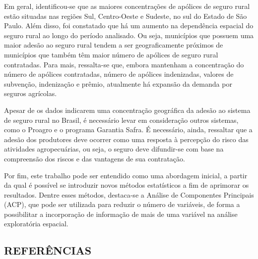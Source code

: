 Em geral, identificou-se que as maiores concentrações de apólices de seguro rural estão situadas nas regiões Sul, Centro-Oeste e Sudeste, no sul do Estado de São Paulo. Além disso, foi constatado que há um aumento na dependência espacial do seguro rural ao longo do período analisado. Ou seja, municípios que possuem uma maior adesão ao seguro rural tendem a ser geograficamente próximos de municípios que também têm maior número de apólices de seguro rural contratadas. Para mais, ressalta-se que, embora mantenham a concentração do número de apólices contratadas, número de apólices indenizadas, valores de subvenção, indenização e prêmio, atualmente há expansão da demanda por seguros agrícolas. 

Apesar de os dados indicarem uma concentração geográfica da adesão ao sistema de seguro rural no Brasil, é necessário levar em consideração outros sistemas, como o Proagro e o programa Garantia Safra. É necessário, ainda, ressaltar que a adesão dos produtores deve ocorrer como uma resposta à percepção do risco das atividades agropecuárias, ou seja, o seguro deve difundir-se com base na compreensão dos riscos e das vantagens de sua contratação. 

Por fim, este trabalho pode ser entendido como uma abordagem inicial, a partir da qual é possível se introduzir novos métodos estatísticos a fim de aprimorar os resultados. Dentre esses métodos, destaca-se a Análise de Componentes Principais (ACP), que pode ser utilizada para reduzir o número de variáveis,  de forma a possibilitar a incorporação de informação de mais de uma variável na análise exploratória espacial.

\newpage
{}
\begin{center}
\section*{REFERÊNCIAS} 
\end{center}


